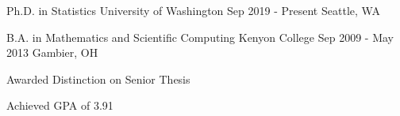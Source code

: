 
\begin{cventries}

  \cventry
    {Ph.D. in Statistics}
    {University of Washington}
    {Sep 2019 - Present}
    {Seattle, WA}
    {}

  \cventry
    {B.A. in Mathematics and Scientific Computing}
    {Kenyon College}
    {Sep 2009 - May 2013}
    {Gambier, OH}
    {
      \begin{cvitems}
        \item {Awarded Distinction on Senior Thesis}
        \item {Achieved GPA of 3.91}
      \end{cvitems}
    }

\end{cventries}
